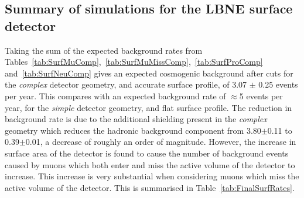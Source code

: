 \subsection{Summary of simulations for the LBNE surface detector}
Taking the sum of the expected background rates from Tables~\ref{tab:SurfMuComp},~\ref{tab:SurfMuMissComp},~\ref{tab:SurfProComp} and~\ref{tab:SurfNeuComp} gives an expected cosmogenic background after cuts for the \emph{complex} detector geometry, and accurate surface profile, of 3.07 $\pm$ 0.25 events per year. This compares with an expected background rate of $\approx$5 events per year, for the \emph{simple} detector geometry, and flat surface profile. The reduction in background rate is due to the additional shielding present in the \emph{complex} geometry which reduces the hadronic background component from 3.80$\pm$0.11 to 0.39$\pm$0.01, a decrease of roughly an order of magnitude. However, the increase in surface area of the detector is found to cause the number of background events caused by muons which both enter and miss the active volume of the detector to increase. This increase is very substantial when considering muons which miss the active volume of the detector. This is summarised in Table~\ref{tab:FinalSurfRates}. \\

